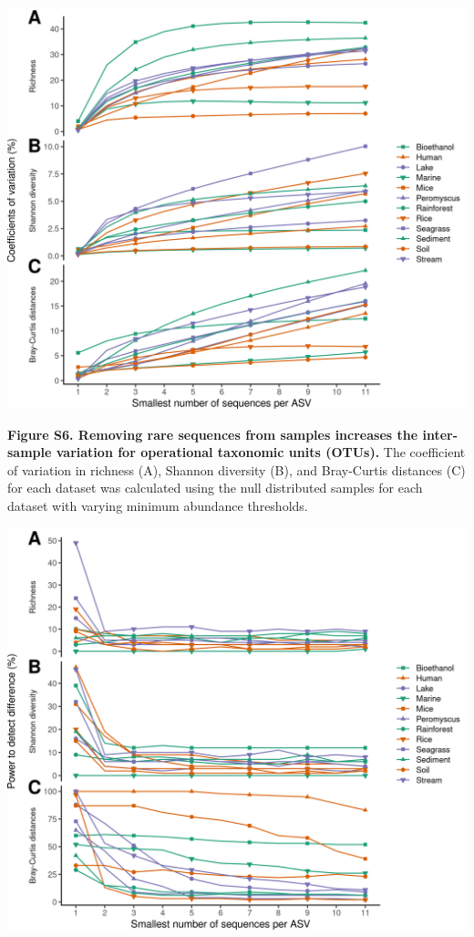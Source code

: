 \documentclass[
]{article}
\begin{document}
\includegraphics{figure_s6.png}

\textbf{Figure S6. Removing rare sequences from samples increases the
inter-sample variation for operational taxonomic units (OTUs).} The
coefficient of variation in richness (A), Shannon diversity (B), and
Bray-Curtis distances (C) for each dataset was calculated using the null
distributed samples for each dataset with varying minimum abundance
thresholds.

\newpage

\includegraphics{figure_s7.png}
\end{document}
